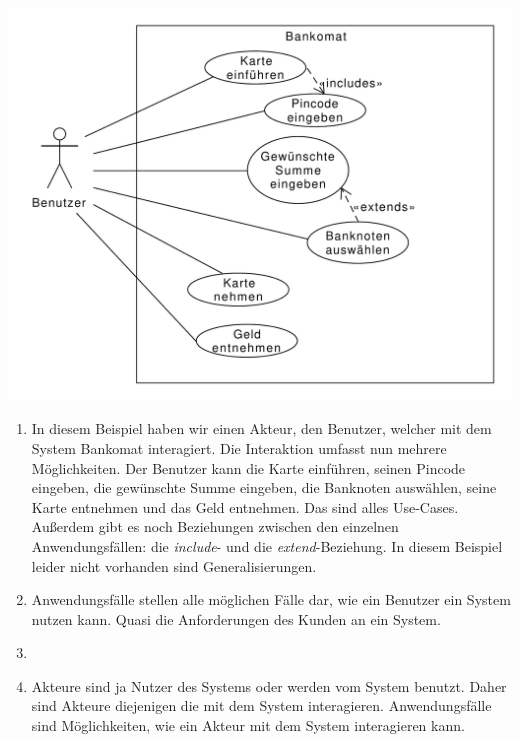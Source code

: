 \documentclass[a4paper, 12pt, margins=2.5cm]{homework}
\begin{document}
  

  \begin{problem}
    
  \end{problem}
  \begin{solution}\hfill
    \begin{center}
      \includegraphics[scale=0.6]{Theoriebsp.pdf}
    \end{center}
    \begin{enumerate}[label=\alph*)]\itemsep0pt
      \item In diesem Beispiel haben wir einen Akteur, den Benutzer, welcher mit
            dem System Bankomat interagiert. Die Interaktion umfasst nun mehrere
            Möglichkeiten. Der Benutzer kann die Karte einführen, seinen Pincode
            eingeben, die gewünschte Summe eingeben, die Banknoten auswählen, seine
            Karte entnehmen und das Geld entnehmen. Das sind alles Use-Cases. Außerdem
            gibt es noch Beziehungen zwischen den einzelnen Anwendungsfällen: die
            \emph{include}- und die \emph{extend}-Beziehung. In diesem Beispiel
            leider nicht vorhanden sind Generalisierungen.

      \item Anwendungsfälle stellen alle möglichen Fälle dar, wie ein Benutzer ein
            System nutzen kann. Quasi die Anforderungen des Kunden an ein System.

      \item 

      \item Akteure sind ja Nutzer des Systems oder werden vom System benutzt. 
            Daher sind Akteure diejenigen die mit dem System interagieren.
            Anwendungsfälle sind Möglichkeiten, wie ein Akteur mit dem System
            interagieren kann.
    \end{enumerate}
  \end{solution}
  
\end{document}
